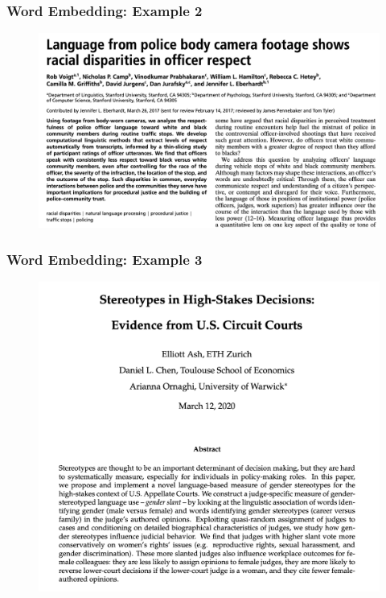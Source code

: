 \documentclass[
  shownotes,
  xcolor={svgnames},
  hyperref={colorlinks,citecolor=DarkBlue,linkcolor=DarkRed,urlcolor=DarkBlue}
  , aspectratio=169]{beamer}
\begin{document}
\begin{frame}
\frametitle{Word Embedding: Example 2 }


  \begin{figure}[H] \centering
            \captionsetup{justification=centering}
              \includegraphics[scale=0.4]{figures/body_camera}
              
 \end{figure}

\end{frame}
\begin{frame}
\frametitle{Word Embedding: Example 3 }


  \begin{figure}[H] \centering
            \captionsetup{justification=centering}
              \includegraphics[scale=0.35]{figures/high_stakes_decisions}
              
 \end{figure}

\end{frame}
\end{document}
